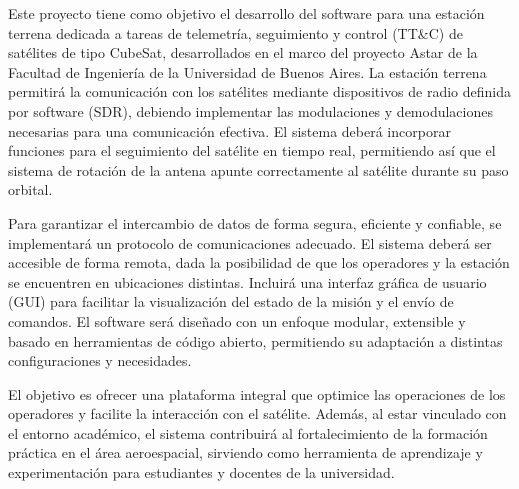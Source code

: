 Este proyecto tiene como objetivo el desarrollo del software para una estación terrena dedicada a tareas de telemetría, seguimiento y control (TT\&C) de satélites de tipo CubeSat, desarrollados en el marco del proyecto Astar de la Facultad de Ingeniería de la Universidad de Buenos Aires. La estación terrena permitirá la comunicación con los satélites mediante dispositivos de radio definida por software (SDR), debiendo implementar las modulaciones y demodulaciones necesarias para una comunicación efectiva. El sistema deberá incorporar funciones para el seguimiento del satélite en tiempo real, permitiendo así que el sistema de rotación de la antena apunte correctamente al satélite durante su paso orbital.

Para garantizar el intercambio de datos de forma segura, eficiente y confiable, se implementará un protocolo de comunicaciones adecuado. El sistema deberá ser accesible de forma remota, dada la posibilidad de que los operadores y la estación se encuentren en ubicaciones distintas. Incluirá una interfaz gráfica de usuario (GUI) para facilitar la visualización del estado de la misión y el envío de comandos. El software será diseñado con un enfoque modular, extensible y basado en herramientas de código abierto, permitiendo su adaptación a distintas configuraciones y necesidades.

El objetivo es ofrecer una plataforma integral que optimice las operaciones de los operadores y facilite la interacción con el satélite. Además, al estar vinculado con el entorno académico, el sistema contribuirá al fortalecimiento de la formación práctica en el área aeroespacial, sirviendo como herramienta de aprendizaje y experimentación para estudiantes y docentes de la universidad.
